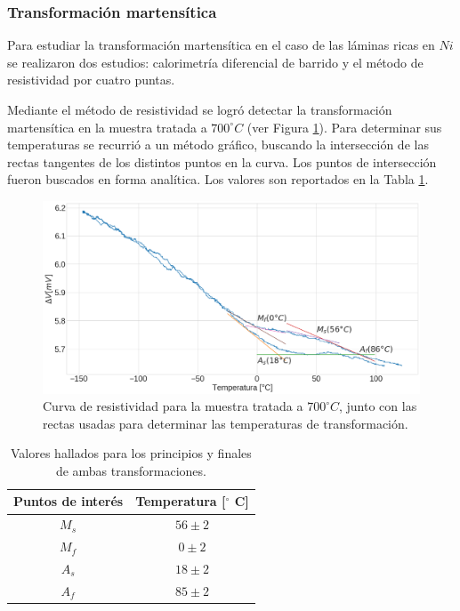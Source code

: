 \documentclass[12pt]{article}
\theoremstyle{definition}
\theoremstyle{remark}
\begin{document}
{\subsubsection{Transformación martensítica}
Para estudiar la transformación martensítica en el caso de las láminas ricas en $Ni$ se realizaron dos estudios: calorimetría diferencial de barrido y el método de resistividad por cuatro puntas.

Mediante el método de resistividad se logró detectar la transformación martensítica en la muestra tratada a $700 ^\circ C$ (ver Figura \ref{Res700}). Para determinar sus temperaturas se recurrió a un método gráfico, buscando la intersección de las rectas tangentes de los distintos puntos en la curva. Los puntos de intersección fueron buscados en forma analítica. Los valores son reportados en la Tabla \ref{TransformationPoints}.

\begin{figure}[H]
 	\centering
	\includegraphics[scale=0.3]{img/Resistance_700.png}
 	\caption{Curva de resistividad para la muestra tratada a $700 ^\circ C$, junto con las rectas usadas para determinar las temperaturas de transformación.}
	\label{Res700}
\end{figure}



\begin{table}[h]
\centering
\begin{tabular}{|c|c|}
\hline
Puntos de interés & Temperatura {[}$^\circ$ C{]} \\ \hline
$M_s$             & $56 \pm 2$                   \\ \hline
$M_f$             & $0 \pm 2$                    \\ \hline
$A_s$             & $18 \pm 2$                   \\ \hline
$A_f$             & $85 \pm 2$                   \\ \hline
\end{tabular}
\caption{Valores hallados para los principios y finales de ambas transformaciones.}
\label{TransformationPoints}
\end{table}

}
\end{document}
